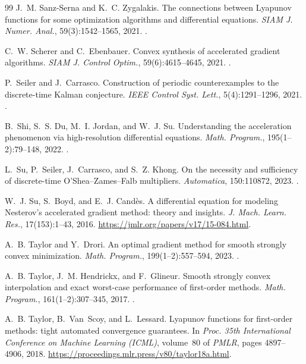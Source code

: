 \documentclass[11pt]{article}
\theoremstyle{definition}
\theoremstyle{remark}
\begin{document}
\begin{thebibliography}{99}
 J.~M. Sanz-Serna and K.~C. Zygalakis. The connections between Lyapunov functions for some optimization algorithms and differential equations. \textit{SIAM J. Numer. Anal.}, 59(3):1542--1565, 2021. .

 C.~W. Scherer and C.~Ebenbauer. Convex synthesis of accelerated gradient algorithms. \textit{SIAM J. Control Optim.}, 59(6):4615--4645, 2021. .

 P.~Seiler and J.~Carrasco. Construction of periodic counterexamples to the discrete-time Kalman conjecture. \textit{IEEE Control Syst. Lett.}, 5(4):1291--1296, 2021. .

 B.~Shi, S.~S. Du, M.~I. Jordan, and W.~J. Su. Understanding the acceleration phenomenon via high-resolution differential equations. \textit{Math. Program.}, 195(1--2):79--148, 2022. .

 L.~Su, P.~Seiler, J.~Carrasco, and S.~Z. Khong. On the necessity and sufficiency of discrete-time O'Shea--Zames--Falb multipliers. \textit{Automatica}, 150:110872, 2023. .

 W.~J. Su, S.~Boyd, and E.~J. Cand\`es. A differential equation for modeling Nesterov's accelerated gradient method: theory and insights. \textit{J. Mach. Learn. Res.}, 17(153):1--43, 2016. \url{https://jmlr.org/papers/v17/15-084.html}.

 A.~B. Taylor and Y.~Drori. An optimal gradient method for smooth strongly convex minimization. \textit{Math. Program.}, 199(1--2):557--594, 2023. .

 A.~B. Taylor, J.~M. Hendrickx, and F.~Glineur. Smooth strongly convex interpolation and exact worst-case performance of first-order methods. \textit{Math. Program.}, 161(1--2):307--345, 2017. .

 A.~B. Taylor, B.~Van~Scoy, and L.~Lessard. Lyapunov functions for first-order methods: tight automated convergence guarantees. In \textit{Proc. 35th International Conference on Machine Learning (ICML)}, volume~80 of \textit{PMLR}, pages 4897--4906, 2018. \url{https://proceedings.mlr.press/v80/taylor18a.html}.


\end{thebibliography}
\end{document}
